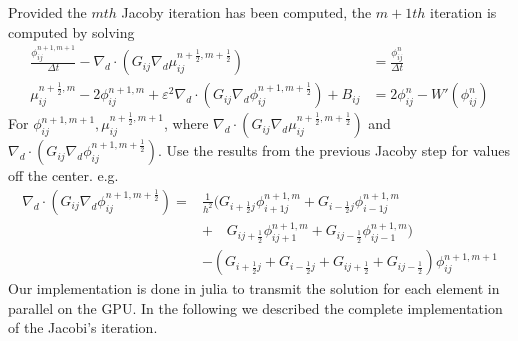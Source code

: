 \documentclass{mimosis}
\begin{document}
Provided the \(mth\) Jacoby iteration has been computed, the \(m+1th\) iteration is computed by solving
\begin{equation}
\begin{aligned}
\frac{\phi_{ij}^{n+1,m+1}}{\Delta t}  -  \nabla _d \cdot (G_{ij} \nabla_d \mu_{ij}^{n+\frac{1}{2},m+\frac{1}{2}} ) &= \frac{ \phi_{ij}^{n}}{\Delta t}  \\
 \mu_{ij}^{n+\frac{1}{2},m} - 2\phi_{ij}^{n+1,m} + \varepsilon^2  \nabla_d \cdot  (G_{ij} \nabla _d \phi_{ij}^{n+1,m+\frac{1}{2}} ) + B_{ij} &=2\phi _{ij}^n - W'(\phi_{ij}^n)
\end{aligned}
\end{equation}
For \(\phi_{ij}^{n+1,m+1} , \mu_{ij}^{n+\frac{1}{2},m+1}\),
where \(\nabla _d \cdot (G_{ij} \nabla_d \mu_{ij}^{n+\frac{1}{2},m+\frac{1}{2}} )\) and \(\nabla_d \cdot  (G_{ij} \nabla _d \phi_{ij}^{n+1,m+\frac{1}{2}} )\).  Use the results from the previous Jacoby step for values off the center. e.g.
\begin{equation}
\begin{aligned}
 \nabla _d \cdot (G_{ij} \nabla_d \phi_{ij}^{n+1,m+\frac{1}{2}} )  =&
\frac{1}{h^2} (
G_{i+\frac{1}{2}j}\phi_{i+1j}^{n+1,m}
+ G_{i-\frac{1}{2}j}\phi_{i-1j}^{n+1,m} \\
& + \quad G_{ij+\frac{1}{2}}\phi_{ij+1}^{n+1,m}
+ G_{ij-\frac{1}{2}}\phi_{ij-1}^{n+1,m}
 ) \\
& -
\left(
 G_{i+\frac{1}{2}j}
 + G_{i-\frac{1}{2}j}
 + G_{ij+\frac{1}{2}}
 + G_{ij-\frac{1}{2}}
\right)\phi_{ij}^{n+1,m+1}
\end{aligned}
\end{equation}
Our implementation is done in julia to transmit the solution for each element in parallel on the GPU. In the following we described the complete implementation of the Jacobi's iteration.
\end{document}
